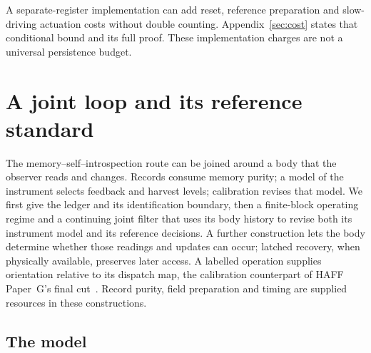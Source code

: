\documentclass[12pt]{article}
\theoremstyle{definition}
\begin{document}
A separate-register implementation can add reset, reference preparation
and slow-driving actuation costs without double counting.
Appendix~\ref{sec:cost} states that conditional bound and its full proof.
These implementation charges are not a universal persistence budget.

\section{A joint loop and its reference standard}
\label{sec:autonomous}

The memory--self--introspection route can be joined around a body that the observer reads and changes. Records consume memory purity; a model of the instrument selects feedback and harvest levels; calibration revises that model. We first give the ledger and its identification boundary, then a finite-block operating regime and a continuing joint filter that uses its body history to revise both its instrument model and its reference decisions. A further construction lets the body determine whether those readings and updates can occur; latched recovery, when physically available, preserves later access. A labelled operation supplies orientation relative to its dispatch map, the calibration counterpart of HAFF Paper~G's final cut~\cite{Liu2026HAFF_G}. Record purity, field preparation and timing are supplied resources in these constructions.

\subsection{The model}
\label{subsec:J_model}
\end{document}

